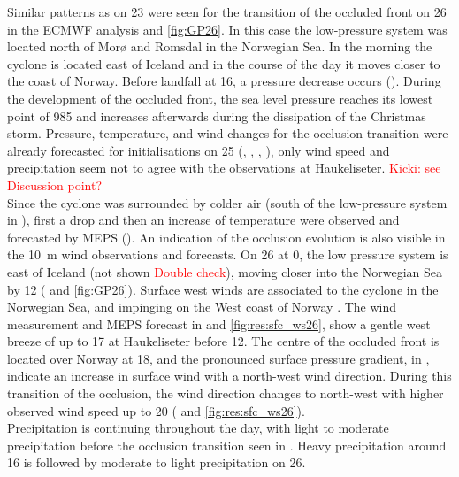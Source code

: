 Similar patterns as on \SI{23}{\dec} were seen for the transition of the occluded front on \SI{26}{\dec} in the ECMWF analysis  and \ref{fig:GP26}. In this case the low-pressure system was located north of Morø and Romsdal in the Norwegian Sea. In the morning the cyclone is located east of Iceland and in the course of the day it moves closer to the coast of Norway. Before landfall at \SI{16}{\UTC}, a pressure decrease occurs (). During the development of the occluded front, the sea level pressure reaches its lowest point of \SI{985}{\hPa} and increases afterwards during the dissipation of the Christmas storm. Pressure, temperature, and wind changes for the occlusion transition were already forecasted for initialisations on \SI{25}{\dec} (, , , ), only wind speed and precipitation seem not to agree with the observations at Haukeliseter. \textcolor{red}{Kicki: see Discussion point?}
\\
Since the cyclone was surrounded by colder air (south of the low-pressure system in ), first a drop and then an increase of temperature were observed and forecasted by MEPS (). An indication of the occlusion evolution is also visible in the \SI{10}{\metre} wind observations and forecasts. 
On \SI{26}{\dec} at \SI{0}{\UTC}, the low pressure system is east of Iceland (not shown \textcolor{red}{Double check}), moving closer into the Norwegian Sea by \SI{12}{\UTC} ( and \ref{fig:GP26}). 
Surface west winds are associated to the cyclone in the Norwegian Sea, and impinging on the West coast of Norway . The wind measurement and MEPS forecast in  and \ref{fig:res:sfc_ws26}, show a gentle west breeze of up to \SI{17}{\mPs} at Haukeliseter before \SI{12}{\UTC}.
The centre of the occluded front is located over Norway at \SI{18}{\UTC}, and the pronounced surface pressure gradient, in , indicate an increase in surface wind with a north-west wind direction. During this transition of the occlusion, the wind direction changes to north-west with higher observed wind speed up to \SI{20}{\mPs} ( and \ref{fig:res:sfc_ws26}). 
\\
Precipitation is continuing throughout the day, with light to moderate precipitation before the occlusion transition seen in . Heavy precipitation around \SI{16}{\UTC} is followed by moderate to light precipitation on \SI{26}{\dec}. 
